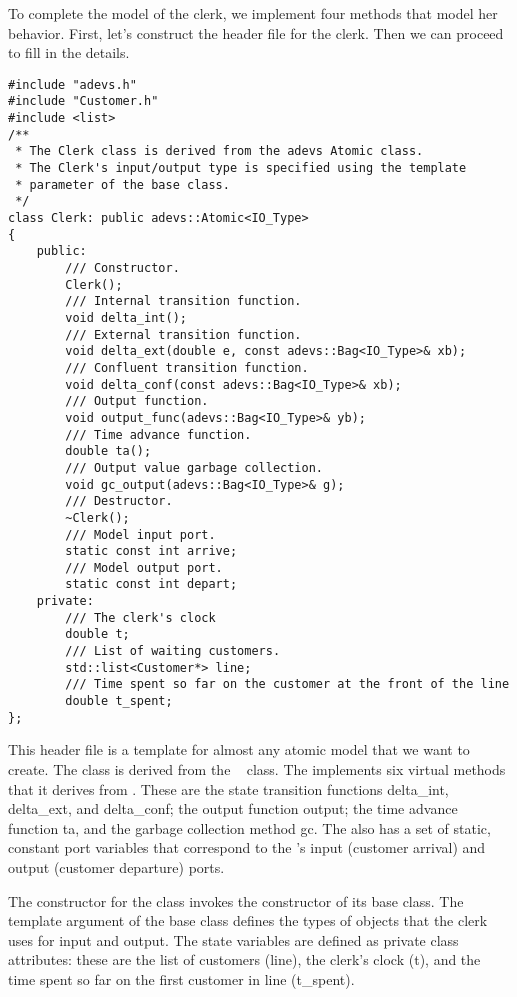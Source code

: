 To complete the model of the clerk, we implement four methods that model her behavior. First, let's construct the header file for the clerk. Then we can proceed to fill in the details.
\begin{verbatim}
#include "adevs.h"
#include "Customer.h"
#include <list>
/**
 * The Clerk class is derived from the adevs Atomic class.
 * The Clerk's input/output type is specified using the template
 * parameter of the base class.
 */
class Clerk: public adevs::Atomic<IO_Type> 
{
    public:
        /// Constructor.
        Clerk();
        /// Internal transition function.
        void delta_int();
        /// External transition function.
        void delta_ext(double e, const adevs::Bag<IO_Type>& xb);
        /// Confluent transition function.
        void delta_conf(const adevs::Bag<IO_Type>& xb);
        /// Output function.  
        void output_func(adevs::Bag<IO_Type>& yb);
        /// Time advance function.
        double ta();
        /// Output value garbage collection.
        void gc_output(adevs::Bag<IO_Type>& g);
        /// Destructor.
        ~Clerk();
        /// Model input port.
        static const int arrive;
        /// Model output port.
        static const int depart;
    private:
        /// The clerk's clock
        double t;
        /// List of waiting customers.
        std::list<Customer*> line;
        /// Time spent so far on the customer at the front of the line
        double t_spent;
};
\end{verbatim}
This header file is a template for almost any atomic model that we want to create. The  class is derived from the \adevs\  class. The  implements six virtual methods that it derives from . These are the state transition functions delta\_int, delta\_ext, and delta\_conf; the output function output; the time advance function ta, and the garbage collection method gc. The  also has a set of static, constant port variables that correspond to the 's input (customer arrival) and output (customer departure) ports.

The constructor for the  class invokes the constructor of its  base class. The template argument of the base class defines the types of objects that the clerk uses for input and output. The  state variables are defined as private class attributes: these are the list of customers (line), the clerk's clock (t), and the time spent so far on the first customer in line (t\_spent).

